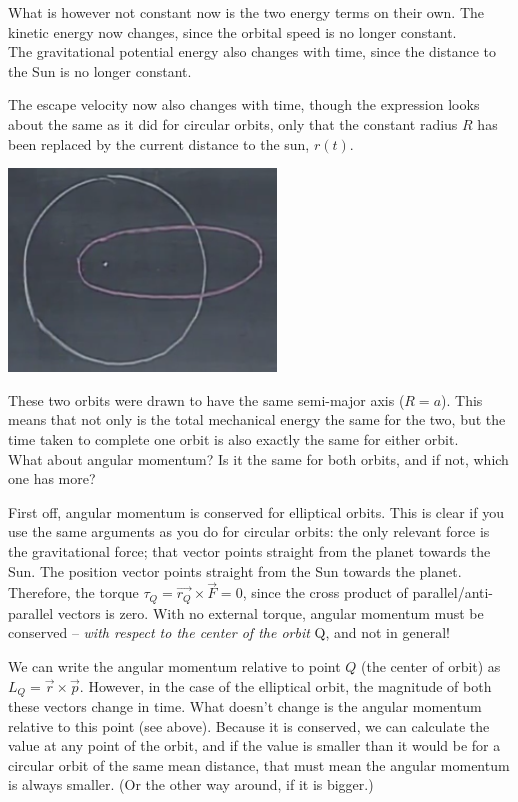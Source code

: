 \documentclass[8.01x]{subfiles}
\begin{document}
What is however not constant now is the two energy terms on their own. The kinetic energy now changes, since the orbital speed is no longer constant.\\
The gravitational potential energy also changes with time, since the distance to the Sun is no longer constant.

The escape velocity now also changes with time, though the expression looks about the same as it did for circular orbits, only that the constant radius $R$ has been replaced by the current distance to the sun, $r(t)$.

\begin{center}
\includegraphics[scale=0.6]{Graphics/lec22_equivalent_orbits}
\end{center}

These two orbits were drawn to have the same semi-major axis ($R = a$). This means that not only is the total mechanical energy the same for the two, but the time taken to complete one orbit is also exactly the same for either orbit.\\
What about angular momentum? Is it the same for both orbits, and if not, which one has more?

First off, angular momentum is conserved for elliptical orbits. This is clear if you use the same arguments as you do for circular orbits: the only relevant force is the gravitational force; that vector points straight from the planet towards the Sun. The position vector points straight from the Sun towards the planet. Therefore, the torque $\tau_Q = \vec{r_Q} \times \vec{F} = 0$, since the cross product of parallel/anti-parallel vectors is zero. With no external torque, angular momentum must be conserved -- \emph{with respect to the center of the orbit} Q, and not in general!

We can write the angular momentum relative to point $Q$ (the center of orbit) as $L_Q = \vec{r} \times \vec{p}$. However, in the case of the elliptical orbit, the magnitude of both these vectors change in time.  What doesn't change is the angular momentum relative to this point (see above). Because it is conserved, we can calculate the value at any point of the orbit, and if the value is smaller than it would be for a circular orbit of the same mean distance, that must mean the angular momentum is always smaller. (Or the other way around, if it is bigger.)
\end{document}

